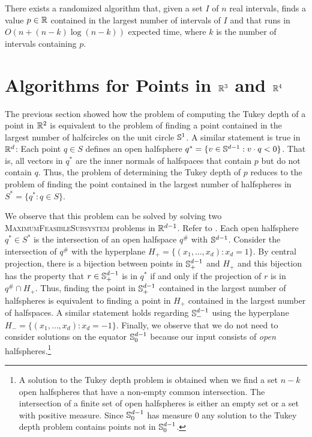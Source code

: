 \documentclass[charterfonts,lotsofwhite]{patmorin}
\begin{document}
\begin{thm}
There exists a randomized algorithm that, given a set $I$ of $n$ real
intervals, finds a value $p\in\mathbb{R}$ contained in the largest number of
intervals of $I$ and that runs in $O(n+(n-k)\log (n-k))$ expected
time, where $k$ is the number of intervals containing $p$.
\end{thm}


\section{Algorithms for Points in $\mathbb{R}^3$ and $\mathbb{R}^4$}

The previous section showed how the problem of computing the Tukey
depth of a point in $\mathbb{R}^2$ is equivalent to the problem of finding a
point contained in the largest number of halfcircles on the unit
circle $\mathbb{S}^1$.  A similar statement is true in $\mathbb{R}^d$:  Each point
$q\in S$ defines an open halfsphere $q^*=\{ v\in\mathbb{S}^{d-1} : v\cdot q <
0\}$.  That is, all vectors in $q^*$ are the inner normals of
halfspaces that contain $p$ but do not contain $q$.  Thus, the problem
of determining the Tukey depth of $p$ reduces to the problem of
finding the point contained in the largest number of halfspheres in
$S^*=\{q^* : q\in S\}$.

We observe that this problem can be solved by solving two
\textsc{MaximumFeasibleSubsystem} problems in $\mathbb{R}^{d-1}$. Refer to 
.  Each open
halfsphere $q^*\in S^*$ is the intersection of an open halfspace
$q^\#$ with $\mathbb{S}^{d-1}$.  Consider the intersection of $q^\#$ with the
hyperplane $H_+=\{(x_1,\ldots,x_d):x_d=1\}$.  By central projection,
there is a bijection between points in $\mathbb{S}^{d-1}_+$ and $H_+$ and
this bijection has the property that $r\in\mathbb{S}^{d-1}_+$ is in $q^*$ if
and only if the projection of $r$ is in $q^\#\cap H_+$.  Thus, finding
the point in $\mathbb{S}^{d-1}_+$ contained in the largest number of
halfspheres is equivalent to finding a point in $H_+$ contained in the
largest number of halfspaces.  A similar statement holds regarding
$\mathbb{S}^{d-1}_-$ using the hyperplane $H_-=\{(x_1,\ldots,x_d):x_d=-1\}$.
Finally, we observe that we do not need to consider solutions on the
equator $\mathbb{S}^{d-1}_0$ because our input consists of \emph{open}
halfspheres.\footnote{A solution to the Tukey depth problem is
obtained when we find a set $n-k$ open halfspheres that have a
non-empty common intersection.  The intersection of a finite set of open
halfspheres is either an empty set or a set with positive measure.
Since $\mathbb{S}^{d-1}_0$ has measure 0 any solution to the Tukey depth
problem contains points not in $\mathbb{S}^{d-1}_0$.}
\end{document}
